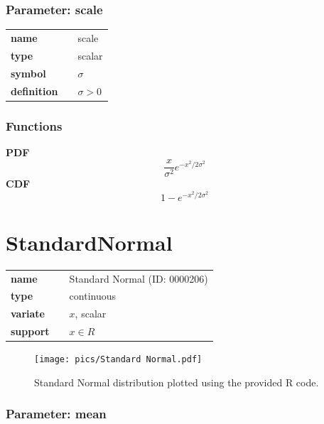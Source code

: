\documentclass{article}
\begin{document}
\subsubsection*{Parameter: scale}

\noindent\begin{tabular}{p{2cm}cl}
\textbf{name} & & scale \\
\textbf{type} & & scalar \\
\textbf{symbol} & & $\sigma$  \\
\textbf{definition} & & $\sigma > 0$
\end{tabular}
\subsubsection*{Functions}

\smallskip \noindent \hspace{.2cm} \textbf{PDF} 
\begin{equation*}\frac{x}{\sigma^2} e^{-x^2/2\sigma^2}\end{equation*}
\smallskip \noindent \hspace{.2cm} \textbf{CDF} 
\begin{equation*}1 - e^{-x^2/2\sigma^2}\end{equation*}
\smallskip\section*{StandardNormal} 

  \bigskip 

\begin{tabular}{p{2cm}cl}
\textbf{name} & & Standard Normal (ID: 0000206)\\ 
 
\textbf{type} & & continuous \\ 

\textbf{variate} & & $x$, scalar \\ 

\textbf{support} & & $x \in R$
\end{tabular}

\begin{figure}[ht!]
\centering
  \texttt{[image: pics/Standard Normal.pdf]}
 \caption{Standard Normal distribution plotted using the provided R code.}
 \label{fig:Standard Normal}
\end{figure}

\subsubsection*{Parameter: mean}
\end{document}
